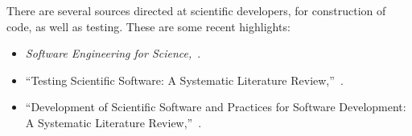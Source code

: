 \documentclass[fleqn,10pt]{olplainarticle}
\begin{document}
There are several sources directed at scientific developers, for
construction of code, as well as testing. These are some recent highlights:
\begin{itemize}
	\item \emph{Software Engineering for Science,}~\cite{carver2017}.
	\item ``Testing Scientific Software: A Systematic Literature Review,''~\cite{kanewala2014}.
	\item ``Development of Scientific Software and Practices for Software Development: A Systematic Literature Review,''~\cite{neumann2016}.
\end{itemize}


\end{document}
